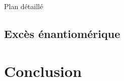 \begin{reportBlock}{Plan détaillé}
\subsection{Excès énantiomérique}



\section{}

\subsection{}






\section{Conclusion} 


\end{reportBlock}





